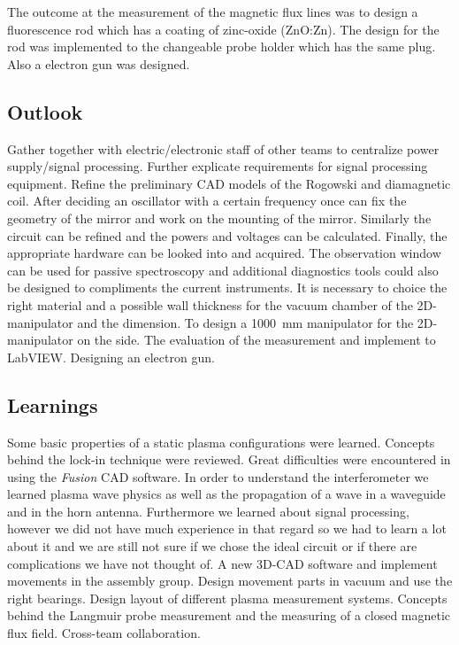 The outcome at the measurement of the magnetic flux lines was to design a fluorescence rod which has a coating of zinc-oxide (ZnO:Zn). The design for the rod was implemented to the changeable probe holder which has the same plug. Also a electron gun was designed.


\subsection{Outlook}


Gather together with electric/electronic staff  of other teams to
centralize power supply/signal processing.
Further explicate requirements for signal processing equipment.
Refine the preliminary
CAD models of the Rogowski and diamagnetic coil.
After deciding an oscillator with a certain frequency once can fix the geometry of the mirror and work on the mounting of the mirror. Similarly the circuit can be refined and the powers and voltages can be calculated. Finally, the appropriate hardware can be looked into and acquired.
The observation window can be used for passive spectroscopy and additional diagnostics tools could also be designed to compliments the current instruments. It is necessary to choice the right material and a possible wall thickness  for the vacuum chamber of the 2D-manipulator and the dimension. To design a 1000~mm manipulator for the 2D-manipulator on the side. The evaluation of the measurement and implement to LabVIEW. Designing an electron gun.


\subsection{Learnings}


Some basic properties of a static plasma configurations were learned.
Concepts behind the lock-in technique were reviewed.
Great difficulties were encountered in using the \emph{Fusion} CAD software.
In order to understand the interferometer we learned plasma wave physics as well as the propagation of a wave in a waveguide and in the horn antenna. Furthermore we learned about signal processing, however we did not have much experience in that regard so we had to learn a lot about it and we are still not sure if we chose the ideal circuit or if there are complications we have not thought of. A new 3D-CAD software and implement movements in the assembly group. Design movement parts in vacuum and use the right bearings. Design layout of different plasma measurement systems. Concepts behind the Langmuir probe measurement and the measuring of a closed magnetic flux field. Cross-team collaboration.
